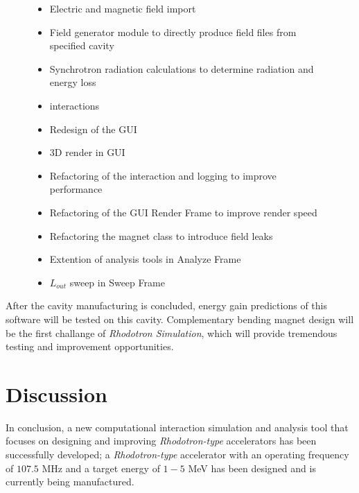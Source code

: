 \documentclass[a4paper,oneside,12pt]{report}
\numberwithin{equation}{chapter}
\begin{document}
\begin{figure}[H]
    \begin{minipage}[t]{0.5\textwidth}
        \begin{itemize}
            \item Electric and magnetic field import
            \item Field generator module to directly produce field files from specified cavity
            \item Synchrotron radiation calculations to determine radiation and energy loss
            \item \ee interactions
            \item Redesign of the GUI
            \item 3D render in GUI
        \end{itemize}
    \end{minipage}
    \begin{minipage}[t]{0.5\textwidth}
        \begin{itemize}
            \item Refactoring of the \eEM interaction and logging to improve performance
            \item Refactoring of the GUI Render Frame to improve render speed
            \item Refactoring the magnet class to introduce field leaks
            \item Extention of analysis tools in Analyze Frame
            \item $L_{out}$ sweep in Sweep Frame
        \end{itemize}
    \end{minipage}
\vspace{-10pt}\end{figure}

After the cavity manufacturing is concluded, energy gain predictions of this software will be tested on this cavity. 
Complementary bending magnet design will be the first challange of \textit{Rhodotron Simulation}, which will provide tremendous testing and improvement opportunities.

\section{Discussion}
In conclusion, a new computational \eEM interaction simulation and analysis tool that focuses on designing and improving \textit{Rhodotron-type} accelerators has been successfully developed; 
a \textit{Rhodotron-type} accelerator with an operating frequency of $107.5$ MHz and a target energy of $1-5$ MeV has been designed and is currently being manufactured.
\end{document}
